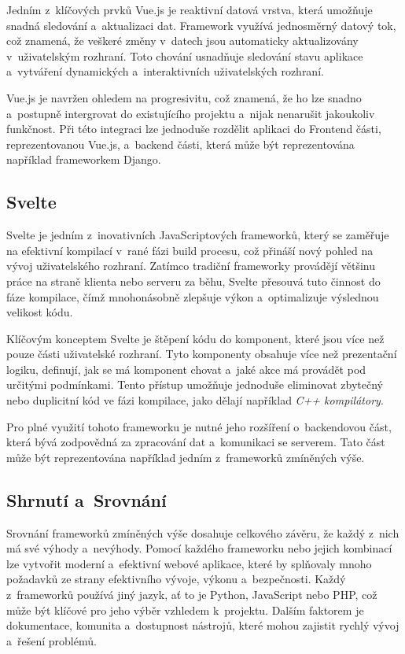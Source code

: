 Jedním z~klíčových prvků Vue.js je reaktivní datová vrstva, která umožňuje snadná sledování a~aktualizaci dat. Framework využívá jednosměrný datový tok, což znamená, že veškeré změny v~datech jsou automaticky aktualizovány v~uživatelským rozhraní. Toto chování usnadňuje sledování stavu aplikace a~vytváření dynamických a~interaktivních uživatelských rozhraní.

Vue.js je navržen ohledem na progresivitu, což znamená, že ho lze snadno a~postupně intergrovat do existujícího projektu a~nijak nenarušit jakoukoliv funkčnost. Při této integraci lze jednoduše rozdělit aplikaci do Frontend části, reprezentovanou Vue.js, a~backend části, která může být reprezentována například frameworkem Django. \cite{about_vuejs}

\subsection{Svelte}
\label{subsec:dev-framework-svelte}
Svelte je jedním z~inovativních JavaScriptových frameworků, který se zaměřuje na efektivní kompilací v~rané fázi build procesu, což přináší nový pohled na vývoj uživatelského rozhraní. Zatímco tradiční frameworky provádějí většinu práce na straně klienta nebo serveru za běhu, Svelte přesouvá tuto činnost do fáze kompilace, čímž mnohonásobně zlepšuje výkon a~optimalizuje výslednou velikost kódu.

Klíčovým konceptem Svelte je štěpení kódu do komponent, které jsou více než pouze části uživatelské rozhraní. Tyto komponenty obsahuje více než prezentační logiku, definují, jak se má komponent chovat a~jaké akce má provádět pod určitými podmínkami. Tento přístup umožňuje jednoduše eliminovat zbytečný nebo duplicitní kód ve fázi kompilace, jako dělají například \textit{C++ kompilátory}.

Pro plné využití tohoto frameworku je nutné jeho rozšíření o~backendovou část, která bývá zodpovědná za zpracování dat a~komunikaci se serverem. Tato část může být reprezentována například jedním z~frameworků zmíněných výše. \cite{about_svelte}

\subsection{Shrnutí a~Srovnání}
\label{subsec:dev-framework-comparison}
Srovnání frameworků zmíněných výše dosahuje celkového závěru, že každý z~nich má své výhody a~nevýhody. Pomocí každého frameworku nebo jejich kombinací lze vytvořit moderní a~efektivní webové aplikace, které by splňovaly mnoho požadavků ze strany efektivního vývoje, výkonu a~bezpečnosti.
Každý z~frameworků používá jiný jazyk, ať to je Python, JavaScript nebo PHP, což může být klíčové pro jeho výběr vzhledem k~projektu. Dalším faktorem je dokumentace, komunita a~dostupnost nástrojů, které mohou zajistit rychlý vývoj a~řešení problémů.

